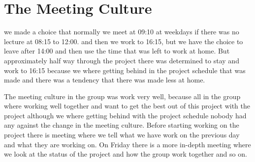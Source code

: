 \section{The Meeting Culture}
we made a choice that normally we meet at 09:10 at weekdays if there was no lecture at 08:15 to 12:00. and then we work to 16:15, but we have the choice to leave after 14:00 and then use the time that was left to work at home. But approximately half way through the project there was determined to stay and work to 16:15 because we where getting behind in the project schedule that was made and there was a tendency that there was made less at home.

The meeting culture in the group was work very well, because all in the group where working well together and want to get the best out of this project with the project although we where getting behind with the project schedule nobody had any against the change in the meeting culture. Before starting working on the project there is meeting where we tell what we have work on the previous day and what they are working on. On Friday there is a more in-depth meeting where we look at the status of the project and how the group work together and so on.